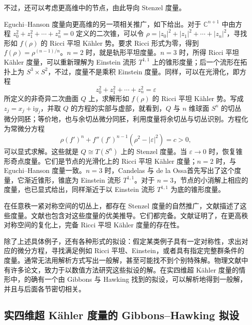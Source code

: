 不过，还可以考虑更高维中的节点，由此导向 Stenzel 度量。

\begin{example}\label{ex:7.3}
Eguchi--Hanson 度量向更高维的另一项相关推广，如下给出。对于 $\mathbb C^{n+1}$ 中由方程 $z_0^2+z_1^2+\cdots+z_n^2=0$ 定义的二次锥，可以令 $\rho=|z_0|^2+|z_1|^2+\cdots+|z_n|^2$，寻找形如 $f(\rho)$ 的 Ricci 平坦 Kähler 势。要求 Ricci 形式为零，得到 $f(\rho)=\rho^{(n-1)/n}$。$n=2$ 时，就是轨形平坦度量。$n=3$ 时，所得 Ricci 平坦 Kähler 度量，可以重新理解为 Einstein 流形 $T^{1,1}$ 上的锥形度量；后一个流形在拓扑上为 $S^3\times S^2$，不过，度量不是乘积 Einstein 度量。同样，可以在光滑化，即方程
\[
z_0^2+z_1^2+\cdots+z_n^2=\varepsilon
\]
所定义的非奇异二次曲面 $Q$ 上，求解形如 $f(\rho)$ 的 Ricci 平坦 Kähler 势。写成 $z_j=x_j+\mathrm i y_j$，并取 $Q$ 的方程的实部与虚部，就看到，$Q$ 与 $n$ 维球面 $S^n$ 的切丛微分同胚；等价地，也与余切丛微分同胚，利用度量将余切丛与切丛识别。方程化为常微分方程
\[
\rho(f')^n+f''(f')^{n-1}(\rho^2-|\varepsilon|^2)=c>0,
\]
可以显式求解。这些就是 $Q\cong T(S^n)$ 上的 Stenzel 度量。当 $\varepsilon\to0$ 时，恢复锥形奇点度量。它们是节点的光滑化上的 Ricci 平坦 Kähler 度量；$n=2$ 时，与 Eguchi--Hanson 度量一致。$n=3$ 时，Candelas 与 de la Ossa首先写出了这个度量，它渐近锥形，锥底为 Einstein 流形 $T^{1,1}$。对于 $n=3$，节点的小消解上相应的度量，也已显式给出，同样渐近于以 Einstein 流形 $T^{1,1}$ 为底的锥形度量。

在任意秩一紧对称空间的切丛上，都存在 Stenzel 度量的自然推广，文献描述了这些度量。文献也包含对这些度量的优美推导。它们都完备。文献证明了，在更高秩对称空间的复化上，完备 Ricci 平坦 Kähler 度量的存在性。
\end{example}

除了上述具体例子，还有各种形式的拟设：假定某类例子具有一定对称性，求出对应的微分方程，寻找满足例如 Ricci 平坦、Einstein，或者具有指定完整群条件的度量。通常无法用解析方式写出一般解，甚至可能找不到个别特殊解。物理文献中有许多论文，致力于以数值方法研究这些拟设的解。在实四维超 Kähler 度量的情形中，的确有一个由 Gibbons 与 Hawking 找到的拟设，可以解析地得到一般解，并且与后面各节密切相关。

\subsection{实四维超 Kähler 度量的 Gibbons--Hawking 拟设}\label{sec:7.1.2}


